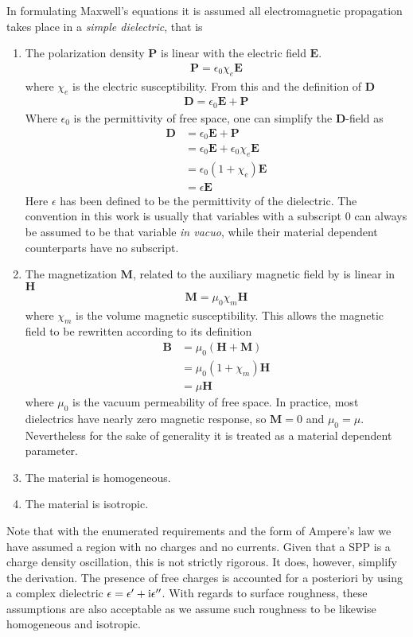 In formulating Maxwell's equations it is assumed all electromagnetic
propagation takes place in a {\it simple dielectric}, that is
\begin{enumerate}
\item The polarization density $\mathbf{P}$ is linear with the electric
field $\mathbf{E}$.  
\begin{align}
\mathbf{P}=\epsilon_0\chi_e\mathbf{E}
\end{align}
where $\chi_e$ is the electric susceptibility.  From this and the definition
of $\mathbf{D}$
\begin{align}
\mathbf{D}=\epsilon_0\mathbf{E}+\mathbf{P}
\label{eqn:dfield}
\end{align}
Where $\epsilon_0$ is the permittivity of free space, one can simplify the
$\mathbf{D}$-field as 
\begin{align}
\mathbf{D}&=\epsilon_0\mathbf{E}+\mathbf{P}\\
&=\epsilon_0 \mathbf{E}+\epsilon_0 \chi_e \mathbf{E}\\
&=\epsilon_0(1+\chi_e)\mathbf{E}\\
&=\epsilon\mathbf{E}
\end{align}
Here $\epsilon$ has been defined to be the permittivity of the
dielectric.  The convention in this work is usually that variables with a
subscript $0$ can always be assumed to be that variable {\it in vacuo},
while their material dependent counterparts have no subscript.
\item The magnetization $\mathbf{M}$, related to the auxiliary magnetic
field by is linear in $\mathbf{H}$
\begin{align}
\mathbf{M}=\mu_0\chi_m\mathbf{H}
\end{align}
where $\chi_m$ is the volume magnetic susceptibility.  This allows the
magnetic field to be rewritten according to its definition
\begin{align}
\mathbf{B}&=\mu_0\left(\mathbf{H}+\mathbf{M}\right)\\
&=\mu_0\left(1+\chi_m\right)\mathbf{H}\\
&=\mu \mathbf{H}
\end{align}
where $\mu_0$ is the vacuum permeability of free space.  In practice, most
dielectrics have nearly zero magnetic response, so $\mathbf{M}=0$ and
$\mu_0=\mu$.  Nevertheless for the sake of generality it is treated as a
material dependent parameter.
\item The material is homogeneous.
\item The material is isotropic.
\end{enumerate}
Note that with the enumerated requirements and the form of Ampere's law we
have assumed a region with no charges and no currents.  Given that a SPP is
a charge density oscillation, this is not strictly rigorous.  It does,
however, simplify the derivation.  The presence of free charges is
accounted for {a posteriori} by using a complex dielectric $\epsilon =
\epsilon' + {\mathrm{i}} \epsilon''$.  With regards to surface roughness, these
assumptions are also acceptable as we assume such roughness to be likewise
homogeneous and isotropic.

